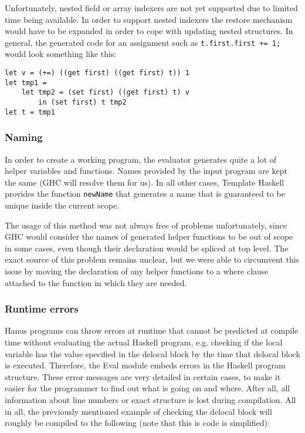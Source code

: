 \documentclass[12pt,a4paper]{article}
\begin{document}
Unfortunately, nested field or array indexers are not yet supported due to limited time being available. In order to support nested indexers the restore mechanism would have to be expanded in order to cope with updating nested structures. In general, the generated code for an assignment such as \texttt{t.first.first += 1;} would look something like this: 

\begin{verbatim}
let v = (+=) ((get first) ((get first) t)) 1
let tmp1 = 
    let tmp2 = (set first) ((get first) t) v 
        in (set first) t tmp2
let t = tmp1
\end{verbatim}

\subsubsection{Naming}
In order to create a working program, the evaluator generates quite a lot of helper variables and functions. Names provided by the input program are kept the same (GHC will resolve them for us). In all other cases, Template Haskell provides the function \texttt{newName} that generates a name that is guaranteed to be unique inside the current scope. 

The usage of this method was not always free of problems unfortunately, since GHC would consider the names of generated helper functions to be out of scope in some cases, even though their declaration would be spliced at top level. The exact source of this problem remains unclear, but we were able to circumvent this issue by moving the declaration of any helper functions to a where clause attached to the function in which they are needed. 

\subsubsection{Runtime errors}
Hanus programs can throw errors at runtime that cannot be predicted at compile time without evaluating the actual Haskell program, e.g. checking if the local variable has the value specified in the delocal block by the time that delocal block is executed. Therefore, the Eval module embeds errors in the Haskell program structure. These error messages are very detailed in certain cases, to make it easier for the programmer to find out what is going on and where. After all, all information about line numbers or exact structure is lost during compilation. All in all, the previously mentioned example of checking the delocal block will roughly be compiled to the following (note that this is code is simplified):
\end{document}
